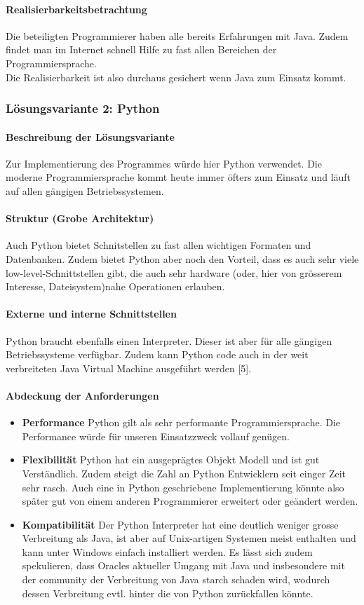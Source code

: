 \documentclass[10pt,paper=a4,final]{scrartcl}
\begin{document}
\paragraph{Realisierbarkeitsbetrachtung}
Die beteiligten Programmierer haben alle bereits Erfahrungen mit Java. Zudem findet man im Internet schnell Hilfe zu fast allen Bereichen der Programmiersprache.\\
Die Realisierbarkeit ist also durchaus gesichert wenn Java zum Einsatz kommt.

\subsubsection{L\"osungsvariante 2: Python}
\paragraph{Beschreibung der L\"osungsvariante}
Zur Implementierung des Programmes w\"urde hier Python verwendet. Die moderne Programmiersprache kommt heute immer \"ofters zum Einsatz und l\"auft auf allen g\"angigen Betriebssystemen.
\paragraph{Struktur (Grobe Architektur)}
Auch Python bietet Schnitstellen zu fast allen wichtigen Formaten und Datenbanken. Zudem bietet Python aber noch den Vorteil, dass es auch sehr viele low-level-Schnittstellen gibt, die auch sehr hardware (oder, hier von gr\"osserem Interesse, Dateisystem)nahe Operationen erlauben.
\paragraph{Externe und interne Schnittstellen}
Python braucht ebenfalls einen Interpreter. Dieser ist aber f\"ur alle g\"angigen Betriebssysteme verf\"ugbar. Zudem kann Python code auch in der weit verbreiteten Java Virtual Machine ausgef\"uhrt werden [5].
\paragraph{Abdeckung der Anforderungen}
\begin{itemize}
  \item {\bf Performance} Python gilt als sehr performante Programmiersprache. Die Performance w\"urde f\"ur unseren Einsatzzweck vollauf gen\"ugen.
  \item {\bf Flexibilit\"at} Python hat ein ausgepr\"agtes Objekt Modell und ist gut Verst\"andlich. Zudem steigt die Zahl an Python Entwicklern seit einger Zeit sehr rasch. Auch eine in Python geschriebene Implementierung k\"onnte also sp\"ater gut von einem anderen Programmierer erweitert oder ge\"andert werden.
  \item {\bf Kompatibilit\"at} Der Python Interpreter hat eine deutlich weniger grosse Verbreitung als Java, ist aber auf Unix-artigen Systemen meist enthalten und kann unter Windows einfach installiert werden. Es l\"asst sich zudem spekulieren, dass Oracles aktueller Umgang mit Java und insbesondere mit der community der Verbreitung von Java starch schaden wird, wodurch dessen Verbreitung evtl. hinter die von Python zur\"uckfallen k\"onnte.
\end{itemize}
\end{document}
